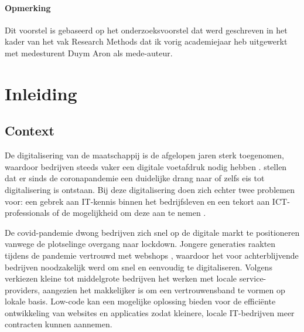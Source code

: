 

\paragraph{Opmerking}

 Dit voorstel is gebaseerd op het onderzoeksvoorstel dat werd geschreven in het
 kader van het vak Research Methods dat ik vorig academiejaar heb
 uitgewerkt met medesturent Duym Aron als mede-auteur.
 
\section{Inleiding}%
\label{sec:inleiding}

\subsection{Context}
\label{sec:Context}

De digitalisering van de maatschappij is de afgelopen jaren sterk toegenomen, waardoor bedrijven steeds vaker een digitale voetafdruk nodig hebben \autocite{schwab2016fourth}. \textcite{almeida2020challenges} stellen dat er sinds de coronapandemie een duidelijke drang naar of zelfs eis tot digitalisering is ontstaan. Bij deze digitalisering doen zich echter twee problemen voor: een gebrek aan IT-kennis binnen het bedrijfsleven \autocite{kutnjak2021covid} en een tekort aan ICT-professionals of de mogelijkheid om deze aan te nemen \autocite{VDAB2024}. 

\vspace{\baselineskip}

De covid-pandemie dwong bedrijven zich snel op de digitale markt te positioneren vanwege de plotselinge overgang naar lockdown. Jongere generaties raakten tijdens de pandemie vertrouwd met webshops \autocite{almeida2020challenges}, waardoor het voor achterblijvende bedrijven noodzakelijk werd om snel en eenvoudig te digitaliseren. Volgens \textcite{findikoglu2011small} verkiezen kleine tot middelgrote bedrijven het werken met locale service-providers, aangezien het makkelijker is om een vertrouwensband te vormen op lokale basis. Low-code kan een mogelijke oplossing bieden voor de efficiënte ontwikkeling van websites en applicaties zodat kleinere, locale IT-bedrijven meer contracten kunnen aannemen. 

